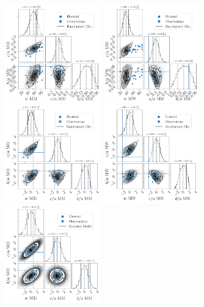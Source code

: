 \documentclass[a4paper,fleqn,usenatbib]{mnras}
\providecommand{\DIFaddbeginFL}{} %
\providecommand{\DIFdelbeginFL}{} %
\providecommand{\DIFdelendFL}{} %
\newcommand{\DIFscaledelfig}{0.5}
\newlength{\DIFdelgraphicswidth} %
\newlength{\DIFdelgraphicsheight} %
\newcommand{\DIFaddincludegraphics}[2][]{{\color{blue}\fbox{\DIFOincludegraphics[#1]{#2}}}} %
\newcommand{\DIFdelincludegraphics}[2][]{%
\sbox{\DIFdelgraphicsbox}{\DIFOincludegraphics[#1]{#2}}%
\settoboxwidth{\DIFdelgraphicswidth}{\DIFdelgraphicsbox} %
\settoboxtotalheight{\DIFdelgraphicsheight}{\DIFdelgraphicsbox} %
\scalebox{\DIFscaledelfig}{%
\parbox[b]{\DIFdelgraphicswidth}{\usebox{\DIFdelgraphicsbox}\\[-\baselineskip] \rule{\DIFdelgraphicswidth}{0em}}\llap{\resizebox{\DIFdelgraphicswidth}{\DIFdelgraphicsheight}{%
\setlength{\unitlength}{\DIFdelgraphicswidth}%
\begin{picture}(1,1)%
\thicklines\linethickness{2pt} %
{\color[rgb]{1,0,0}\put(0,0){\framebox(1,1){}}}%
{\color[rgb]{1,0,0}\put(0,0){\line( 1,1){1}}}%
{\color[rgb]{1,0,0}\put(0,1){\line(1,-1){1}}}%
\end{picture}%
}\hspace*{3pt}}} %
} %
\DeclareRobustCommand{\DIFaddbeginFL}{\DIFOaddbeginFL \let\includegraphics\DIFaddincludegraphics} %
\DeclareRobustCommand{\DIFdelbeginFL}{\DIFOdelbeginFL \let\includegraphics\DIFdelincludegraphics} %
\DeclareRobustCommand{\DIFdelendFL}{\DIFOaddendFL \let\includegraphics\DIFOincludegraphics} %
\begin{document}
\begin{figure}
\centering
\DIFdelbeginFL %
\DIFdelendFL \DIFaddbeginFL \includegraphics[width=0.37\textwidth]{input_illustris1_obs_M31_n_11.pdf}
\includegraphics[width=0.37\textwidth]{input_illustris1_obs_MW_n_11.pdf}
\includegraphics[width=0.37\textwidth]{input_illustris1_obs_M31_n_11_normed.pdf}
\includegraphics[width=0.37\textwidth]{input_illustris1_obs_MW_n_11_normed.pdf}
\includegraphics[width=0.37\textwidth]{gaussian_model_illustris1_M31_n_11.pdf}

\end{figure}
\end{document}
